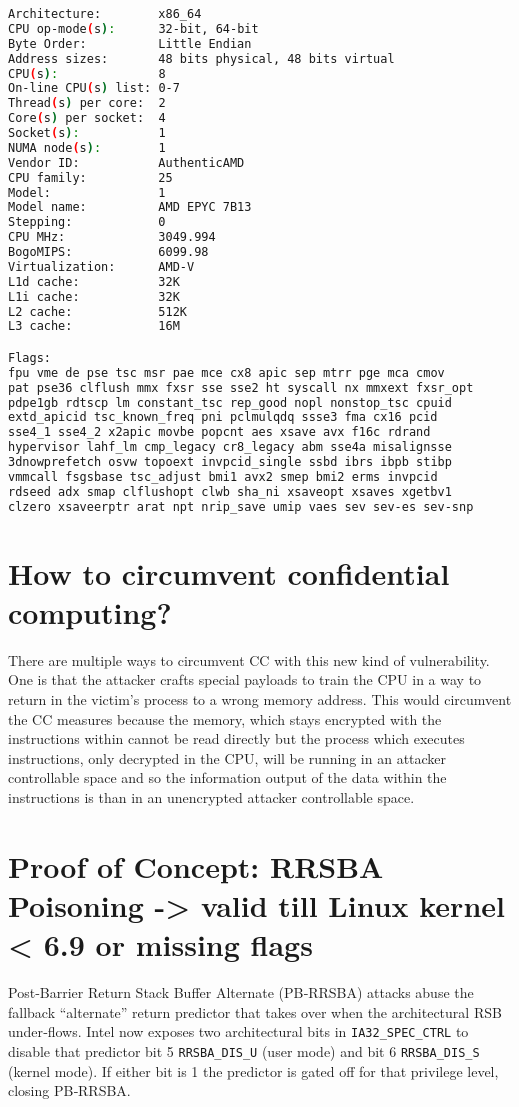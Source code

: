 \documentclass[11pt,a4paper]{article}
\begin{document}
\begin{lstlisting}[language=bash]
Architecture:        x86_64
CPU op-mode(s):      32-bit, 64-bit
Byte Order:          Little Endian
Address sizes:       48 bits physical, 48 bits virtual
CPU(s):              8
On-line CPU(s) list: 0-7
Thread(s) per core:  2
Core(s) per socket:  4
Socket(s):           1
NUMA node(s):        1
Vendor ID:           AuthenticAMD
CPU family:          25
Model:               1
Model name:          AMD EPYC 7B13
Stepping:            0
CPU MHz:             3049.994
BogoMIPS:            6099.98
Virtualization:      AMD-V
L1d cache:           32K
L1i cache:           32K
L2 cache:            512K
L3 cache:            16M

Flags:
fpu vme de pse tsc msr pae mce cx8 apic sep mtrr pge mca cmov 
pat pse36 clflush mmx fxsr sse sse2 ht syscall nx mmxext fxsr_opt 
pdpe1gb rdtscp lm constant_tsc rep_good nopl nonstop_tsc cpuid 
extd_apicid tsc_known_freq pni pclmulqdq ssse3 fma cx16 pcid 
sse4_1 sse4_2 x2apic movbe popcnt aes xsave avx f16c rdrand 
hypervisor lahf_lm cmp_legacy cr8_legacy abm sse4a misalignsse 
3dnowprefetch osvw topoext invpcid_single ssbd ibrs ibpb stibp 
vmmcall fsgsbase tsc_adjust bmi1 avx2 smep bmi2 erms invpcid 
rdseed adx smap clflushopt clwb sha_ni xsaveopt xsaves xgetbv1 
clzero xsaveerptr arat npt nrip_save umip vaes sev sev-es sev-snp
\end{lstlisting}

\section{How to circumvent confidential computing?}
There are multiple ways to circumvent CC with this new kind of vulnerability. One is that the attacker crafts special payloads to train the CPU in a way to return in the victim's process to a wrong memory address. This would circumvent the CC measures because the memory, which stays encrypted with the instructions within cannot be read directly but the process which executes instructions, only decrypted in the CPU, will be running in an attacker controllable space and so the information output of the data within the instructions is than in an unencrypted attacker controllable space.

\section{Proof of Concept: RRSBA Poisoning -> valid till Linux kernel < 6.9 or missing flags}
Post‑Barrier Return Stack Buffer Alternate (PB‑RRSBA) attacks abuse the fallback “alternate” return predictor that takes over when the architectural RSB under‑flows. Intel now exposes two architectural bits in \texttt{IA32\_SPEC\_CTRL} to disable that predictor bit 5 \texttt{RRSBA\_DIS\_U} (user mode) and bit 6 \texttt{RRSBA\_DIS\_S} (kernel mode). If either bit is 1 the predictor is gated off for that privilege level, closing PB‑RRSBA.
\end{document}
